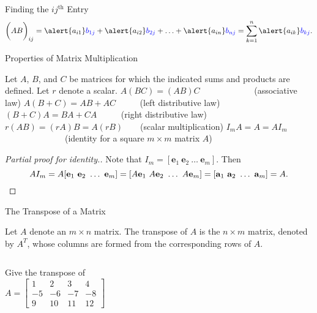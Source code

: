 \documentclass[xcolor=dvipsnames,aspectratio=169,t]{beamer}
\begin{document}
\begin{frame}{Finding the $ij^{\mbox{th}}$ Entry}
\bbox
\[ \bigg( AB \bigg)_{ij}  = \alert{a_{i1}} \colorb{b_{1j}} + \alert{a_{i2}} \colorb{b_{2j}} + \ldots + \alert{a_{in}} \colorb{b_{nj}} 
= \sum_{k=1}^n \alert{a_{ik}} \colorb{b_{kj}}.\]
\ebox

\end{frame}

\begin{frame}{Properties of Matrix Multiplication}

\bbox
Let $A$, $B$, and $C$ be matrices for which the indicated sums and products are defined. Let $r$ denote a scalar.
\bb[a.]
\ii $A(BC) = (AB)C$ \ \ \ \ \ \ \ \ \ \ \ \ (associative law)
\ii $A(B+C) = AB+AC$ \ \ \ \ \ (left distributive law)
\ii $(B+C)A = BA + CA$ \ \ \ \ \ (right distributive law)
\ii $r(AB) = (rA)B = A(rB)$\ \ \ \ (scalar multiplication)
\ii $I_m A = A = AI_m$ \ \ \ \ \ \ \ \ \ \ \ \ \ \ (identity for a square $m \times m$ matrix $A$)
\ee
\ebox

\pause
\begin{proof}[Partial proof for identity.]
  Note that $I_m=[\mathbf{e}_1 \ \mathbf{e}_2 \ \dots \ \mathbf{e}_m]$.
  Then 
  \[
    A I_m = A[\mathbf{e}_1 \ \mathbf{e}_2 \ \dots \ \mathbf{e}_m]
          = [A\mathbf{e}_1 \ A\mathbf{e}_2 \ \dots \ A\mathbf{e}_m]
          = [ \mathbf{a}_1 \ \mathbf{a}_2 \ \dots \ \mathbf{a}_m] = A.\qedhere
  \]
\end{proof}

\end{frame}


\begin{frame}{The Transpose of a Matrix}

\bbox
Let $A$ denote an $m \times n$ matrix. The \alert{transpose} of $A$ is the $n \times m$ matrix, denoted by \alert{$A^T$}, whose columns are formed from the corresponding rows of $A$.
\ebox


\begin{columns}[T]

\column{0.5\tw}

\begin{example}
  Give the transpose of 
\[ A = \begin{bmatrix} 1 & 2 & 3 & 4 \\ -5 & -6 & -7 & -8 \\ 9 & 10 & 11 & 12 \end{bmatrix}\]
\end{example}

\column{0.5\tw}

\ \ 

\end{columns}

\end{frame}
\end{document}
